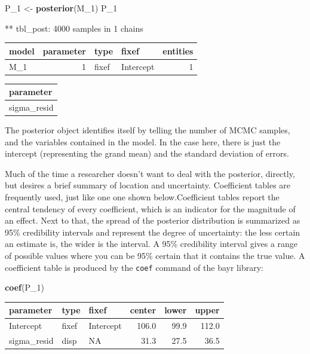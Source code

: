\documentclass[]{svmono}
\newenvironment{Shaded}{\begin{snugshade}}{\end{snugshade}}
\newcommand{\KeywordTok}[1]{\textcolor[rgb]{0.13,0.29,0.53}{\textbf{#1}}}
\newcommand{\DecValTok}[1]{\textcolor[rgb]{0.00,0.00,0.81}{#1}}
\newcommand{\StringTok}[1]{\textcolor[rgb]{0.31,0.60,0.02}{#1}}
\newcommand{\NormalTok}[1]{#1}
\theoremstyle{definition}
\theoremstyle{definition}
\theoremstyle{definition}
\theoremstyle{remark}
\begin{document}
\begin{Shaded}
\begin{Highlighting}[]
\NormalTok{P_}\DecValTok{1}\NormalTok{ <-}\StringTok{ }\KeywordTok{posterior}\NormalTok{(M_}\DecValTok{1}\NormalTok{)}
\NormalTok{P_}\DecValTok{1}
\end{Highlighting}
\end{Shaded}

** tbl\_post: 4000 samples in 1 chains

\begin{longtable}[]{@{}lrllr@{}}
\toprule
model & parameter & type & fixef & entities\tabularnewline
\midrule
\endhead
M\_1 & 1 & fixef & Intercept & 1\tabularnewline
\bottomrule
\end{longtable}

\begin{longtable}[]{@{}l@{}}
\toprule
parameter\tabularnewline
\midrule
\endhead
sigma\_resid\tabularnewline
\bottomrule
\end{longtable}

The posterior object identifies itself by telling the number of MCMC
samples, and the variables contained in the model. In the case here,
there is just the intercept (representing the grand mean) and the
standard deviation of errors.

Much of the time a researcher doesn't want to deal with the posterior,
directly, but desires a brief summary of location and uncertainty.
Coefficient tables are frequently used, just like one one shown
below.Coefficient tables report the central tendency of every
coefficient, which is an indicator for the magnitude of an effect. Next
to that, the spread of the posterior distribution is summarized as 95\%
credibility intervals and represent the degree of uncertainty: the less
certain an estimate is, the wider is the interval. A 95\% credibility
interval gives a range of possible values where you can be 95\% certain
that it contains the true value. A coefficient table is produced by the
\texttt{coef} command of the bayr library:

\begin{Shaded}
\begin{Highlighting}[]
\KeywordTok{coef}\NormalTok{(P_}\DecValTok{1}\NormalTok{)}
\end{Highlighting}
\end{Shaded}

\begin{longtable}[]{@{}lllrrr@{}}
\toprule
parameter & type & fixef & center & lower & upper\tabularnewline
\midrule
\endhead
Intercept & fixef & Intercept & 106.0 & 99.9 & 112.0\tabularnewline
sigma\_resid & disp & NA & 31.3 & 27.5 & 36.5\tabularnewline
\bottomrule
\end{longtable}
\end{document}
